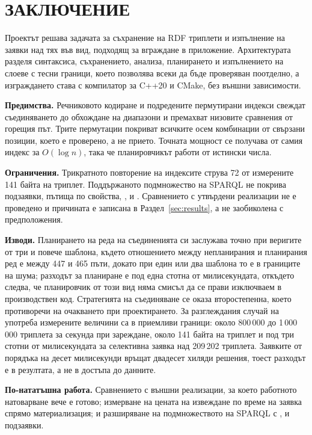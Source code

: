 \section*{ЗАКЛЮЧЕНИЕ}
\label{sec:conclusion}

Проектът решава задачата за съхранение на RDF триплети и изпълнение на заявки над тях във вид,
подходящ за вграждане в приложение. Архитектурата разделя синтаксиса, съхранението, анализа,
планирането и изпълнението на слоеве с тесни граници, което позволява всеки да бъде проверяван
поотделно, а изграждането става с компилатор за C++20 и CMake, без външни зависимости.

\textbf{Предимства.} Речниковото кодиране и подредените пермутирани индекси свеждат
съединяването до обхождане на диапазони и премахват низовите сравнения от горещия път. Трите
пермутации покриват всичките осем комбинации от свързани позиции, което е проверено, а не
прието. Точната мощност се получава от самия индекс за $O(\log n)$, така че планировчикът
работи от истински числа.

\textbf{Ограничения.} Трикратното повторение на индексите струва 72 от измерените 141 байта на
триплет. Поддържаното подмножество на SPARQL не покрива подзаявки, пътища по свойства,
,  и . Сравнението с утвърдени реализации не е проведено
и причината е записана в Раздел~\ref{sec:results}, а не заобиколена с предположения.

\textbf{Изводи.} Планирането на реда на съединенията си заслужава точно при веригите от три и
повече шаблона, където отношението между непланирания и планирания ред е между 447 и 465 пъти,
докато при един или два шаблона то е в границите на шума; разходът за планиране е под една
стотна от милисекундата, откъдето следва, че планировчик от този вид няма смисъл да се прави
изключваем в производствен код. Стратегията на съединяване се оказа второстепенна, което
противоречи на очакването при проектирането. За разглеждания случай на употреба измерените
величини са в приемливи граници: около 800\,000 до 1\,000\,000 триплета за секунда при
зареждане, около 141 байта на триплет и под три стотни от милисекундата за селективна заявка
над 209\,202 триплета. Заявките от порядъка на десет милисекунди връщат двадесет хиляди
решения, тоест разходът е в резултата, а не в достъпа до данните.

\textbf{По-нататъшна работа.} Сравнението с външни реализации, за което работното натоварване
вече е готово; измерване на цената на извеждане по време на заявка спрямо материализация; и
разширяване на подмножеството на SPARQL с ,  и подзаявки.
